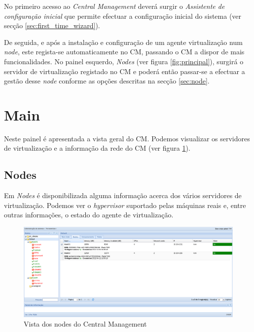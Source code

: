 No primeiro acesso ao \emph{Central Management} deverá surgir o \emph{Assistente de configuração inicial} que permite efectuar a configuração inicial do sistema (ver secção \ref{sec:first_time_wizard}).

De seguida, e após a instalação e configuração de um agente virtualização num \emph{node}, este regista-se automaticamente no CM, passando o CM a dispor de mais funcionalidades.
No painel esquerdo, \emph{Nodes} (ver figura \ref{fig:principal}), surgirá o servidor de virtualização registado no CM e poderá então passar-se a efectuar a gestão desse \emph{node} conforme as opções descritas na secção \ref{sec:node}.

\pagebreak

\section{Main}

Neste painel é apresentada a vista geral do CM.
Podemos visualizar os servidores de virtualização e a informação da rede do CM (ver figura \ref{fig:main_nodes}).

\subsection{Nodes}
\label{sub:nodes}

Em \emph{Nodes} é disponibilizada alguma informação acerca dos vários servidores de virtualização. Podemos ver o \emph{hypervisor} suportado pelas máquinas reais e, entre outras informações, o estado do agente de virtualização.
\begin{figure}[H]
	\begin{center}
	\includegraphics[scale=0.45]{screenshots/main_nodes.png}
	\caption{Vista dos nodes do Central Management}
	\label{fig:main_nodes}
	\end{center}
\end{figure}

